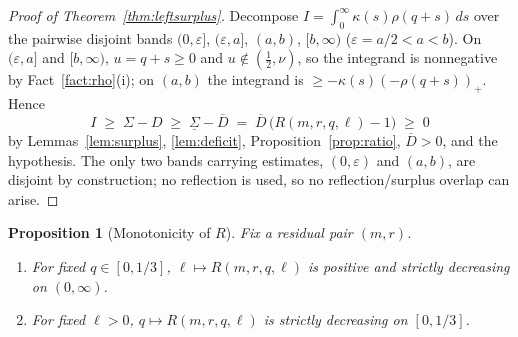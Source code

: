 \documentclass[11pt]{article}
\newtheorem{proposition}[theorem]{Proposition}
\theoremstyle{remark}
\theoremstyle{plain}
\theoremstyle{plain}
\begin{document}
\begin{proof}[Proof of Theorem~\ref{thm:leftsurplus}]
Decompose $I=\int_0^\infty\kappa(s)\rho(q+s)\,ds$ over the pairwise disjoint bands $(0,\varepsilon]$, $(\varepsilon,a]$, $(a,b)$, $[b,\infty)$ ($\varepsilon=a/2<a<b$).  On $(\varepsilon,a]$ and $[b,\infty)$, $u=q+s\ge0$ and $u\notin(\tfrac12,\nu)$, so the integrand is nonnegative by Fact~\ref{fact:rho}(i); on $(a,b)$ the integrand is $\ge-\kappa(s)(-\rho(q+s))_+$.  Hence
\[
        I\;\ge\;\Sigma-D\;\ge\;\underline\Sigma-\overline D
        \;=\;\overline D\,\bigl(R(m,r,q,\ell)-1\bigr)\;\ge\;0
\]
by Lemmas~\ref{lem:surplus}, \ref{lem:deficit}, Proposition~\ref{prop:ratio}, $\overline D>0$, and the hypothesis.  The only two bands carrying estimates, $(0,\varepsilon)$ and $(a,b)$, are disjoint by construction; no reflection is used, so no reflection/surplus overlap can arise.
\end{proof}

\begin{proposition}[Monotonicity of $R$]\label{prop:mono}
Fix a residual pair $(m,r)$.
\begin{enumerate}[label=\textup{(\alph*)}]
\item For fixed $q\in[0,1/3]$, $\ell\mapsto R(m,r,q,\ell)$ is positive and strictly decreasing on $(0,\infty)$.
\item For fixed $\ell>0$, $q\mapsto R(m,r,q,\ell)$ is strictly decreasing on $[0,1/3]$.
\end{enumerate}
\end{proposition}
\end{document}
